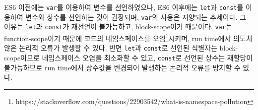ES6 이전에는 \texttt{var}를 이용하여 변수를 선언하였으나, ES6 이후에는 \texttt{let}과 \texttt{const}를 이용하여 변수와 상수를 선언하는 것이 권장되며, \texttt{var}의 사용은 지양되는 추세이다. 그 이유는 \texttt{let}과 \texttt{const}가 재선언이 불가능하고, block-scope이기 때문이다. \texttt{var}는 function-scope이기 때문에 코드의 네임스페이스를 오염\footnote{https://stackoverflow.com/questions/22903542/what-is-namespace-pollution}시키며, run time에서 의도치 않은 논리적 오류가 발생할 수 있다. 반면 \texttt{let}과 \texttt{const}로 선언된 식별자는 block-scope이므로 네임스페이스 오염을 최소화할 수 있고, \texttt{const}로 선언된 상수는 재할당이 불가능하므로 run time에서 상수값을 변경되어 발생하는 논리적 오류를 방지할 수 있다.
